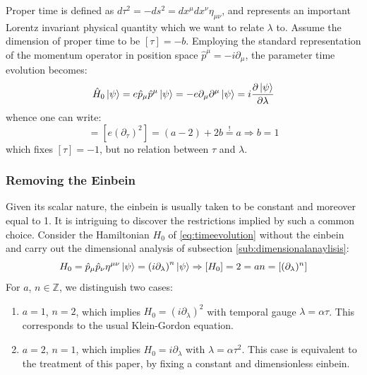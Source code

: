 \documentclass[twoside,a4paper,11pt]{article}
\numberwithin{equation}{section}
\begin{document}
Proper time is defined as $d \tau ^2 = -ds^2 =  dx^\mu dx^\nu \eta_{\mu\nu}$, and represents an important Lorentz invariant physical quantity which we want to relate $\lambda$ to. Assume the dimension of proper time to be $[\tau] = - b$. Employing the standard representation of the momentum operator in position space $\hat{p}^\mu = -i \partial_\mu$, the parameter time evolution becomes:
\begin{equation}
    \hat{H}_0 \ket{\psi} = e \hat{p}_\mu \hat{p}^\mu \ket{\psi} = -  e \partial_\mu \partial^\mu \ket{\psi}= i \dfrac{\partial \ket{\psi}}{\partial \lambda}
    \label{differentialoperatorproblems}
\end{equation}
whence one can write:
\begin{equation}
    [e \partial_\mu \partial^\mu] = [e (\partial_\tau)^2] = (a -2) + 2b \stackrel{!}{=} a \Rightarrow b = 1 
\end{equation}
which fixes $[\tau] = -1$, but no relation between $\tau$ and $\lambda$. 

\subsubsection{Removing the Einbein}
\label{subsec:noeinbein}
Given its scalar nature, the einbein is usually taken to be constant and moreover equal to 1. It is intriguing to discover the restrictions implied by such a common choice. Consider the Hamiltonian $H_0$ of \ref{eq:timeevolution} without the einbein and carry out the dimensional analysis of subsection \ref{sub:dimensionalanaylisis}:
\begin{equation}
H_0 = \hat{p}_\mu \hat{p}_\nu \eta^{\mu\nu} \ket{\psi} = \left( i \partial_\lambda \right)^n \ket{\psi}  \Rightarrow [H_0] = 2 = a n = [(\partial_\lambda)^n]
\end{equation}
For $a$, $n \in \mathbb{Z}$, we distinguish two cases:
\begin{enumerate}
\item $a =1$, $n =2$, which implies $H_0 = (i\partial_\lambda)^2$ with temporal gauge $\lambda = \alpha \tau$. This corresponds to the usual Klein-Gordon equation.

\item $a = 2$, $n = 1$, which implies $H_0 = i\partial_\lambda$ with $\lambda = \alpha \tau^2$. This case is equivalent to the treatment of this paper, by fixing a constant and dimensionless einbein.

\end{enumerate}
\end{document}
